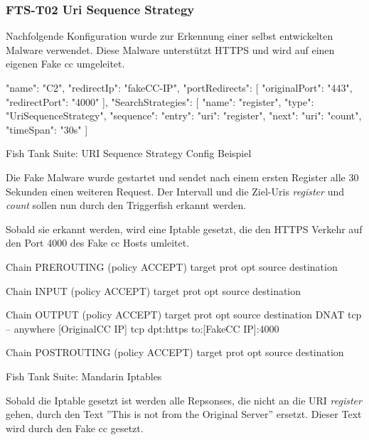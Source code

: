 \subsubsection{FTS-T02 Uri Sequence Strategy}
Nachfolgende Konfiguration wurde zur Erkennung einer selbst entwickelten Malware verwendet. Diese Malware unterstützt HTTPS und wird auf einen eigenen Fake \gls{cc} umgeleitet.
\begin{listing}[H]
\begin{jscode}
{
  "name": "C2",
  "redirectIp": "fakeCC-IP",
  "portRedirects": [
    {
      "originalPort": "443",
      "redirectPort": "4000"
    }
  ],
  "SearchStrategies": [
    {
      "name": "register",
      "type": "UriSequenceStrategy",
      "sequence": {
        "entry": {"uri": "register"},
        "next": {"uri": "count", "timeSpan": "30s"}
      }
    }
  ]
}
\end{jscode}
\caption{Fish Tank Suite: URI Sequence Strategy Config Beispiel}
\label{lst:uri-sequence-strategy-configuration-example-protcol}
\end{listing}


Die Fake Malware wurde gestartet und sendet nach einem ersten Register alle 30 Sekunden einen weiteren Request. Der Intervall und die Ziel-Uris \textit{register} und \textit{count} sollen nun durch den Triggerfish erkannt werden.

Sobald sie erkannt werden, wird eine Iptable gesetzt, die den HTTPS Verkehr auf den Port 4000 des Fake \gls{cc} Hosts umleitet.

\begin{listing}[H]
\begin{fancycode}
Chain PREROUTING (policy ACCEPT)
target     prot opt source               destination         

Chain INPUT (policy ACCEPT)
target     prot opt source               destination         

Chain OUTPUT (policy ACCEPT)
target     prot opt source               destination         
DNAT       tcp  --  anywhere             [OriginalCC IP]  tcp dpt:https to:[FakeCC IP]:4000

Chain POSTROUTING (policy ACCEPT)
target     prot opt source               destination  
\end{fancycode}
\caption{Fish Tank Suite: Mandarin Iptables}
\label{lst:mandarin-https-Iptable}
\end{listing}

Sobald die Iptable gesetzt ist werden alle Repsonses, die nicht an die URI \textit{register} gehen, durch den Text ''This is not from the Original Server'' ersetzt. Dieser Text wird durch den Fake \gls{cc} gesetzt.


